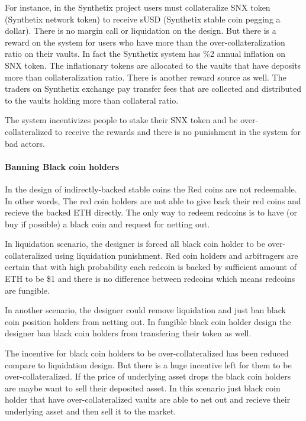 For instance, in the Synthetix project users must collateralize SNX token (Synthetix network token) to receive sUSD (Synthetix stable coin pegging a dollar). There is no margin call or liquidation on the design. But there is a reward on the system for users who have more than the over-collateralization ratio on their vaults. 
In fact the Synthetix system has \%2 annual inflation on SNX token. The inflationary tokens are allocated to the vaults that have deposits more than collateralization ratio.
There is another reward source as well. The traders on Synthetix exchange pay transfer fees that are collected and distributed to the vaults holding more than collateral ratio.

The system incentivizes people to stake their SNX token and be over-collateralized to receive the rewards and there is no punishment in the system for bad actors.

\paragraph{Banning Black coin holders}

In the design of indirectly-backed stable coins the Red coins are not redeemable. In other words, The red coin holders are not able to give back their red coins and recieve the backed ETH directly. The only way to redeem redcoins is to have (or buy if possible) a black coin and request for netting out. 

In liquidation scenario, the designer is forced all black coin holder to be over-collateralized using liquidation punishment. Red coin holders and arbitragers are certain that with high probability each redcoin is backed by sufficient amount of ETH to be \$1 and there is no difference between redcoins which means redcoins are fungible.

In another scenario, the designer could remove liquidation and just ban black coin position holders from netting out. In fungible black coin holder design the designer ban black coin holders from transfering their token as well. 

The incentive for black coin holders to be over-collateralized has been reduced compare to liquidation design. But there is a huge incentive left for them to be over-collateralized. If the price of underlying asset drops the black coin holders are maybe want to sell their deposited asset. In this scenario just black coin holder that have over-collateralized vaults are able to net out and recieve their underlying asset and then sell it to the market.

